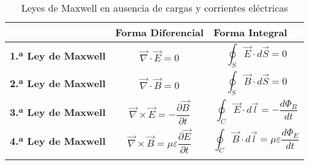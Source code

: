 \begin{longtable}{| r | p{4cm} | p{4cm} |}
  \hline
  \cellcolor{lightgray}\textbf{} & \cellcolor{lightgray}\textbf{Forma Diferencial} & \cellcolor{lightgray}\textbf{Forma Integral} \\
  \hline
  \endhead
  \cellcolor{lightgray}\textbf{1.ª Ley de Maxwell} & 
  \begin{equation}
    \vec{\nabla}\cdot\vec{E} = 0
  \end{equation} &
  \begin{equation}
    \oint_{S} \vec{E} \cdot d\vec{S} = 0
  \end{equation} \\
  \hline
  \cellcolor{lightgray}\textbf{2.ª Ley de Maxwell} & 
  \begin{equation}
    \vec{\nabla}\cdot\vec{B} = 0
  \end{equation} &
  \begin{equation}
    \oint_{S} \vec{B} \cdot d\vec{S} = 0
  \end{equation} \\
  \hline
  \cellcolor{lightgray}\textbf{3.ª Ley de Maxwell} & 
  \begin{equation}
    \vec{\nabla}\times\vec{E} = -\dfrac{\partial \vec{B}}{\partial t}
  \end{equation} &
  \begin{equation}
    \oint_{C} \vec{E} \cdot d\vec{l} = - \dfrac{d\Phi_{B}}{dt}
  \end{equation} \\
  \hline
  \cellcolor{lightgray}\textbf{4.ª Ley de Maxwell} & 
  \begin{equation}
    \vec{\nabla}\times\vec{B} = \mu\varepsilon \dfrac{\partial \vec{E}}{\partial t}
  \end{equation} &
  \begin{equation}
    \oint_{C} \vec{B} \cdot d\vec{l} = \mu\varepsilon \dfrac{d\Phi_{E}}{dt}
  \end{equation} \\
  \hline
  \caption[Leyes de Maxwell en ausencia de cargas y corrientes eleéctricas]{Leyes de Maxwell en ausencia de cargas y corrientes eléctricas}\label{tab:MaxwellsLaws}
\end{longtable}
